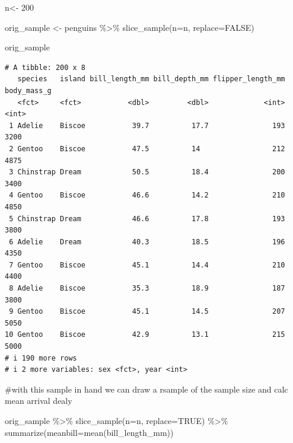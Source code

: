 \documentclass[
  letterpaper,
  DIV=11,
  numbers=noendperiod]{scrartcl}
\newenvironment{Shaded}{\begin{snugshade}}{\end{snugshade}}
\newcommand{\AttributeTok}[1]{\textcolor[rgb]{0.40,0.45,0.13}{#1}}
\newcommand{\CommentTok}[1]{\textcolor[rgb]{0.37,0.37,0.37}{#1}}
\newcommand{\ConstantTok}[1]{\textcolor[rgb]{0.56,0.35,0.01}{#1}}
\newcommand{\DecValTok}[1]{\textcolor[rgb]{0.68,0.00,0.00}{#1}}
\newcommand{\FunctionTok}[1]{\textcolor[rgb]{0.28,0.35,0.67}{#1}}
\newcommand{\NormalTok}[1]{\textcolor[rgb]{0.00,0.23,0.31}{#1}}
\newcommand{\OtherTok}[1]{\textcolor[rgb]{0.00,0.23,0.31}{#1}}
\newcommand{\SpecialCharTok}[1]{\textcolor[rgb]{0.37,0.37,0.37}{#1}}
\begin{document}
\begin{Shaded}
\begin{Highlighting}[]
\NormalTok{n}\OtherTok{\textless{}{-}} \DecValTok{200}

\NormalTok{orig\_sample }\OtherTok{\textless{}{-}}\NormalTok{ penguins }\SpecialCharTok{\%\textgreater{}\%}
  \FunctionTok{slice\_sample}\NormalTok{(}\AttributeTok{n=}\NormalTok{n, }\AttributeTok{replace=}\ConstantTok{FALSE}\NormalTok{)}

\NormalTok{orig\_sample}
\end{Highlighting}
\end{Shaded}

\begin{verbatim}
# A tibble: 200 x 8
   species   island bill_length_mm bill_depth_mm flipper_length_mm body_mass_g
   <fct>     <fct>           <dbl>         <dbl>             <int>       <int>
 1 Adelie    Biscoe           39.7          17.7               193        3200
 2 Gentoo    Biscoe           47.5          14                 212        4875
 3 Chinstrap Dream            50.5          18.4               200        3400
 4 Gentoo    Biscoe           46.6          14.2               210        4850
 5 Chinstrap Dream            46.6          17.8               193        3800
 6 Adelie    Dream            40.3          18.5               196        4350
 7 Gentoo    Biscoe           45.1          14.4               210        4400
 8 Adelie    Biscoe           35.3          18.9               187        3800
 9 Gentoo    Biscoe           45.1          14.5               207        5050
10 Gentoo    Biscoe           42.9          13.1               215        5000
# i 190 more rows
# i 2 more variables: sex <fct>, year <int>
\end{verbatim}

\begin{Shaded}
\begin{Highlighting}[]
\CommentTok{\#with this sample in hand we can draw a rsample of the sample size and calc mean arrival dealy}

\NormalTok{orig\_sample }\SpecialCharTok{\%\textgreater{}\%}
  \FunctionTok{slice\_sample}\NormalTok{(}\AttributeTok{n=}\NormalTok{n, }\AttributeTok{replace=}\ConstantTok{TRUE}\NormalTok{) }\SpecialCharTok{\%\textgreater{}\%}
  \FunctionTok{summarize}\NormalTok{(}\AttributeTok{meanbill=}\FunctionTok{mean}\NormalTok{(bill\_length\_mm))}
\end{Highlighting}
\end{Shaded}
\end{document}
